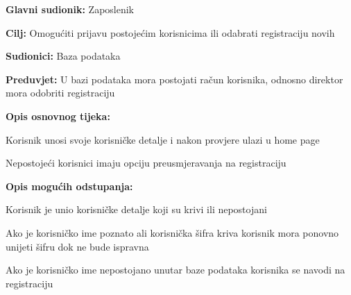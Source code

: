 						\noindent {}
					\begin{packed_item}
						
						\item \textbf{Glavni sudionik:} Zaposlenik
						\item  \textbf{Cilj:} Omogućiti prijavu postojećim korisnicima ili odabrati registraciju novih
						\item  \textbf{Sudionici:} Baza podataka
						\item  \textbf{Preduvjet:} U bazi podataka mora postojati račun korisnika, odnosno direktor mora odobriti registraciju
						\item  \textbf{Opis osnovnog tijeka:}
						
						\item[] \begin{packed_enum}
							
							\item Korisnik unosi svoje korisničke detalje i nakon provjere ulazi u home page
							\item Nepostojeći korisnici imaju opciju preusmjeravanja na registraciju
							
						\end{packed_enum}
						\item  \textbf{Opis mogućih odstupanja:}
						
						\item[] \begin{packed_item}
							
							\item[2.a] Korisnik je unio korisničke detalje koji su krivi ili nepostojani
							\item[] \begin{packed_enum}
								
								\item Ako je korisničko ime poznato ali korisnička šifra kriva korisnik mora ponovno unijeti šifru dok ne bude ispravna
								\item Ako je korisničko ime nepostojano unutar baze podataka korisnika se navodi na registraciju
							\end{packed_enum}
							
						\end{packed_item}					
					\end{packed_item}
					
